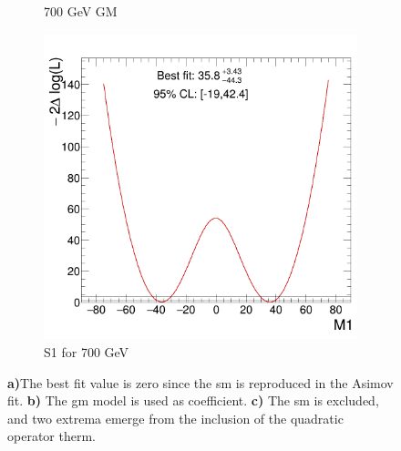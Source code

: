\documentclass[../Bachelorarbeit.tex]{subfiles}
\begin{document}
\begin{figure}[h]
\begin{subfigure}{0.3\textwidth}
        \caption{700 GeV GM}
    \end{subfigure}
    \begin{subfigure}{0.3\textwidth}
        \includegraphics[width=\textwidth]{Plots/operators/c_scan_M1}
        \caption{S1 for 700 GeV}
    \end{subfigure}
    \caption{\textbf{a)}The best fit value is zero since the \acrshort{sm} is reproduced in the Asimov fit. \textbf{b)} The \acrshort{gm} model is used as coefficient.
        \textbf{c)} The \acrshort{sm} is excluded, and two extrema emerge from the inclusion of the quadratic operator therm.}
    \label{fig:EFT_GM_Asimov_comparision}
\end{figure}
\end{document}
